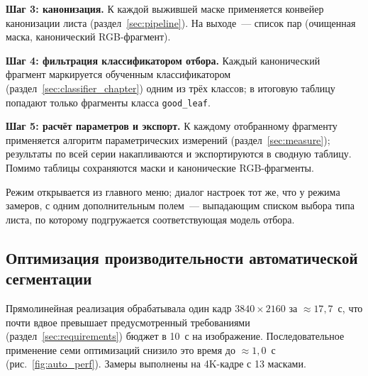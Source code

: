 \textbf{Шаг 3: канонизация.} К каждой выжившей маске применяется конвейер
канонизации листа (раздел~\ref{sec:pipeline}). На выходе~--- список пар
(очищенная маска, канонический RGB-фрагмент).

\textbf{Шаг 4: фильтрация классификатором отбора.} Каждый канонический
фрагмент маркируется обученным классификатором (раздел~\ref{sec:classifier_chapter})
одним из трёх классов; в итоговую таблицу попадают только фрагменты класса
\texttt{good\_leaf}.

\textbf{Шаг 5: расчёт параметров и экспорт.} К каждому отобранному фрагменту
применяется алгоритм параметрических измерений (раздел~\ref{sec:measure}); результаты по всей серии
накапливаются и экспортируются в сводную таблицу. Помимо таблицы сохраняются
маски и канонические RGB-фрагменты.

Режим открывается из главного меню; диалог настроек тот же, что у режима
замеров, с одним дополнительным полем~--- выпадающим списком выбора типа листа,
по которому подгружается соответствующая модель отбора.

\subsection{Оптимизация производительности автоматической сегментации}
\label{sec:auto_perf}

Прямолинейная реализация обрабатывала один кадр $3840 \times 2160$ за
$\approx 17{,}7$~с, что почти вдвое
превышает предусмотренный требованиями (раздел~\ref{sec:requirements}) бюджет в
10~с на изображение. Последовательное применение семи оптимизаций снизило это
время до $\approx 1{,}0$~с (рис.~\ref{fig:auto_perf}). Замеры выполнены на 4K-кадре с
13 масками.

